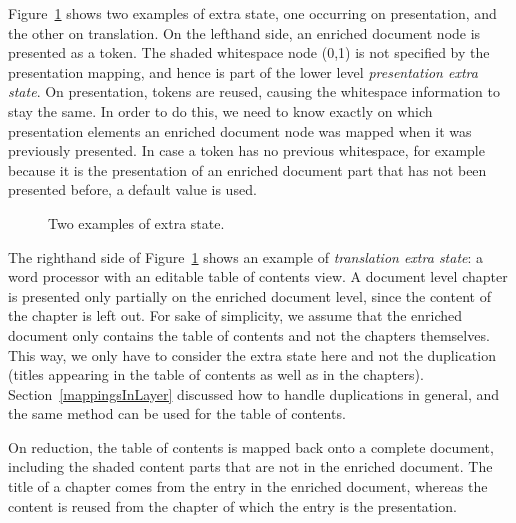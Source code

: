Figure~\ref{layerExtraState} shows two examples of extra state, one occurring on presentation, and the other on translation. On the lefthand side, an enriched document node is presented as a token. The shaded whitespace node (0,1) is not specified by the presentation mapping, and hence is part of the lower level {\em presentation extra state}. On presentation, tokens are reused, causing the whitespace information to stay the same. In order to do this, we need to know exactly on which presentation elements an enriched document node was mapped when it was previously presented. In case a token has no previous whitespace, for example because it is the presentation of an enriched document part that has not been presented before, a default value is used.

\begin{figure}
\begin{center}
\begin{center}
\end{center}
\caption{Two examples of extra state.} \label{layerExtraState} 
\end{center}
\end{figure}


The righthand side of Figure~\ref{layerExtraState} shows an example of {\em translation extra state}: a word processor with an editable table of contents view. A document level chapter is presented only partially on the enriched document level, since the content of the chapter is left out. For sake of simplicity, we assume that the enriched document only contains the table of contents and not the chapters themselves. This way, we only have to consider the extra state here and not the duplication (titles appearing in the table of contents as well as in the chapters). Section~\ref{mappingsInLayer} discussed how to handle duplications in general, and the same method can be used for the table of contents.

On reduction, the table of contents is mapped back onto a complete document, including the shaded content parts that are not in the enriched document. The title of a chapter comes from the entry in the enriched document, whereas the content is reused from the chapter of which the entry is the presentation. 




